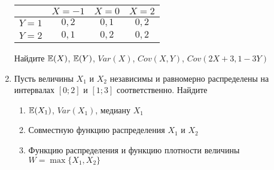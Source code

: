 \documentclass[pdftex,12pt,a4paper]{article}
\begin{document}
\begin{enumerate}
\begin{tabular}{c|ccc}
 & $X=-1$ & $X=0$ & $X=2$ \\ 
\hline 
$Y=1$ & $0{,}2$ & $0{,}1$ & $0{,}2$ \\ 
$Y=2$ & $0{,}1$ & $0{,}2$ & $0{,}2$ \\ 
\end{tabular} 


Найдите $\mathbb{E}(X)$, $\mathbb{E}(Y)$, $Var(X)$, $Cov(X,Y)$, $Cov(2X+3,1-3Y)$

\item Пусть величины $X_1$ и $X_2$ независимы и равномерно распределены на интервалах $[0;2]$ и $[1;3]$ соответственно. Найдите
\begin{enumerate}
\item $\mathbb{E}(X_1)$, $Var(X_1)$, медиану $X_1$
\item Совместную функцию распределения $X_1$ и $X_2$
\item Функцию распределения и функцию плотности величины $W=\max\{X_1,X_2\}$
\end{enumerate}
\end{enumerate}
\end{document}
